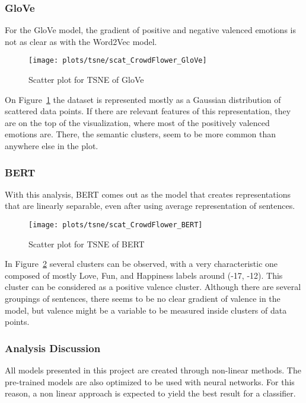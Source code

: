 \subsubsection{GloVe}
For the GloVe model, the gradient of positive and negative valenced emotions is not as clear as with the Word2Vec model.
\begin{figure}[H]
  \texttt{[image: plots/tsne/scat\_CrowdFlower\_GloVe]}
  \centering
  \caption{Scatter plot for TSNE of GloVe}\label{fig:scat_CrowdFlower_GloVe}
\end{figure}
On Figure~\ref{fig:scat_CrowdFlower_GloVe} the dataset is represented mostly as a Gaussian distribution of scattered data points. If there are relevant features of this representation, they are on the top of the visualization, where most of the positively valenced emotions are. There, the semantic clusters, seem to be more common than anywhere else in the plot.

\subsubsection{BERT}
With this analysis, BERT comes out as the model that creates representations that are linearly separable, even after using average representation of sentences.
\begin{figure}[H]
  \texttt{[image: plots/tsne/scat\_CrowdFlower\_BERT]}
  \centering
  \caption{Scatter plot for TSNE of BERT}\label{fig:scat_CrowdFlower_BERT}
\end{figure}
In Figure~\ref{fig:scat_CrowdFlower_BERT} several clusters can be observed, with a very characteristic one composed of mostly Love, Fun, and Happiness labels around (-17, -12). This cluster can be considered as a positive valence cluster. Although there are several groupings of sentences, there seems to be no clear gradient of valence in the model, but valence might be a variable to be measured inside clusters of data points.

\subsubsection{Analysis Discussion}
All models presented in this project are created through non-linear methods. The pre-trained models are also optimized to be used with neural networks. For this reason, a non linear approach is expected to yield the best result for a classifier.

